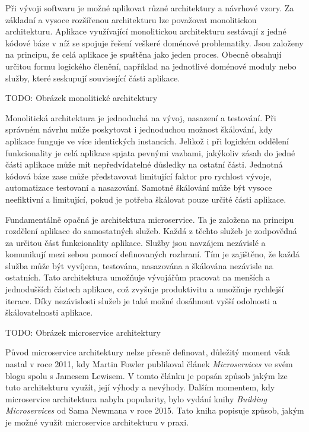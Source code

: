 

Při vývoji softwaru je možné aplikovat různé architektury a návrhové vzory. Za základní a vysoce rozšířenou architekturu lze považovat monolitickou architekturu. Aplikace využívající monolitickou architekturu sestávají z jedné kódové báze v níž se spojuje řešení veškeré doménové problematiky. Jsou založeny na principu, že celá aplikace je spuštěna jako jeden proces. Obecně obsahují určitou formu logického členění, například na jednotlivé doménové moduly nebo služby, které seskupují související části aplikace. \cite{Richardson2018} 

TODO: Obrázek monolitické architektury

Monolitická architektura je jednoduchá na vývoj, nasazení a testování. Při správném návrhu může poskytovat i jednoduchou možnost škálování, kdy aplikace funguje ve více identických instancích. \cite{Richardson2018} Jelikož i při logickém oddělení funkcionality je celá aplikace spjata pevnými vazbami, jakýkoliv zásah do jedné části aplikace může mít nepředvídatelné důsledky na ostatní části. Jednotná kódová báze zase může představovat limitující faktor pro rychlost vývoje, automatizace testovaní a nasazování. Samotné škálování může být vysoce neefiktivní a limitující, pokud je potřeba škálovat pouze určité části aplikace. \cite{Richardson2018}

Fundamentálně opačná je architektura microservice. Ta je založena na principu rozdělení aplikace do samostatných služeb. Každá z těchto služeb je zodpovědná za určitou část funkcionality aplikace. Služby jsou navzájem nezávislé a komunikují mezi sebou pomocí definovaných rozhraní. Tím je zajištěno, že každá služba může být vyvíjena, testována, nasazována a škálována nezávisle na ostatních. Tato architektura umožňuje vývojářům pracovat na menších a jednodušších částech aplikace, což zvyšuje produktivitu a umožňuje rychlejší iterace. Díky nezávislosti služeb je také možné dosáhnout vyšší odolnosti a škálovatelnosti aplikace. \cite{Richardson2018}

TODO: Obrázek microservice architektury


Původ microservice architektury nelze přesně definovat, důležitý moment však nastal v roce 2011, kdy Martin Fowler publikoval článek \textit{Microservices} ve svém blogu spolu s Jamesem Lewisem. \cite{fowlerblog} V tomto článku je popsán způsob jakým lze tuto architekturu využít, její výhody a nevýhody. Dalším momentem, kdy microservice architektura nabyla popularity, bylo vydání knihy \textit{Building Microservices} od Sama Newmana v roce 2015. Tato kniha popisuje způsob, jakým je možné využít microservice architekturu v praxi.

